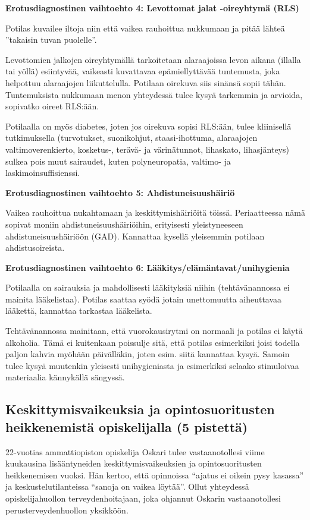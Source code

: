 \documentclass[
]{book}
\begin{document}
\textbf{Erotusdiagnostinen vaihtoehto 4: Levottomat jalat -oireyhtymä (RLS)}

Potilas kuvailee iltoja niin että vaikea rauhoittua nukkumaan ja pitää lähteä ''takaisin tuvan puolelle''.

Levottomien jalkojen oireyhtymällä tarkoitetaan alaraajoissa levon aikana (illalla tai yöllä) esiintyvää, vaikeasti kuvattavaa epämiellyttävää tuntemusta, joka helpottuu alaraajojen liikuttelulla. Potilaan oirekuva siis sinänsä sopii tähän. Tuntemuksista nukkumaan menon yhteydessä tulee kysyä tarkemmin ja arvioida, sopivatko oireet RLS:ään.

Potilaalla on myös diabetes, joten jos oirekuva sopisi RLS:ään, tulee kliinisellä tutkimuksella (turvotukset, suonikohjut, staasi-ihottuma, alaraajojen valtimoverenkierto, kosketus-, terävä- ja värinätunnot, lihaskato, lihasjänteys) sulkea pois muut sairaudet, kuten polyneuropatia, valtimo- ja laskimoinsuffisienssi.

\textbf{Erotusdiagnostinen vaihtoehto 5: Ahdistuneisuushäiriö}

Vaikea rauhoittua nukahtamaan ja keskittymishäiriöitä töissä. Periaatteessa nämä sopivat moniin ahdistuneisuushäiriöihin, erityisesti yleistyneeseen ahdistuneisuushäiriöön (GAD). Kannattaa kysellä yleisemmin potilaan ahdistusoireista.

\textbf{Erotusdiagnostinen vaihtoehto 6: Lääkitys/elämäntavat/unihygienia}

Potilaalla on sairauksia ja mahdollisesti lääkityksiä niihin (tehtävänannossa ei mainita lääkelistaa). Potilas saattaa syödä jotain unettomuutta aiheuttavaa lääkettä, kannattaa tarkastaa lääkelista.

Tehtävänannossa mainitaan, että vuorokausirytmi on normaali ja potilas ei käytä alkoholia. Tämä ei kuitenkaan poissulje sitä, että potilas esimerkiksi joisi todella paljon kahvia myöhään päivälläkin, joten esim. siitä kannattaa kysyä. Samoin tulee kysyä muutenkin yleisesti unihygieniasta ja esimerkiksi selaako stimuloivaa materiaalia kännykällä sängyssä.

\subsection{Keskittymisvaikeuksia ja opintosuoritusten heikkenemistä opiskelijalla (5 pistettä)}\label{keskittymisvaikeuksia-ja-opintosuoritusten-heikkenemistuxe4-opiskelijalla-5-pistettuxe4}

22‑vuotias ammattiopiston opiskelija Oskari tulee vastaanotollesi viime kuukausina lisääntyneiden keskittymisvaikeuksien ja opintosuoritusten heikkenemisen vuoksi. Hän kertoo, että opinnoissa ``ajatus ei oikein pysy kasassa'' ja keskustelutilanteissa ``sanoja on vaikea löytää''. Ollut yhteydessä opiskelijahuollon terveydenhoitajaan, joka ohjannut Oskarin vastaanotollesi perusterveydenhuollon yksikköön.
\end{document}
